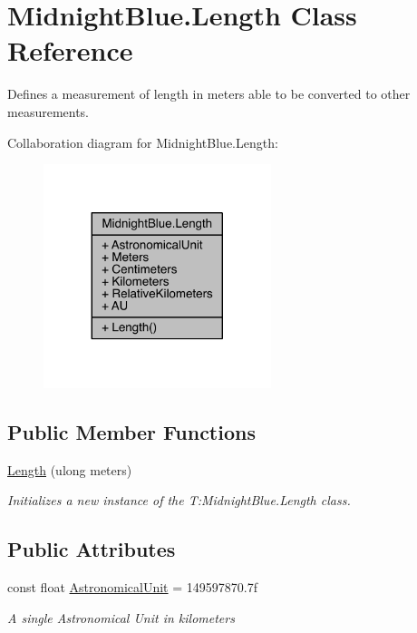 \hypertarget{class_midnight_blue_1_1_length}{}\section{Midnight\+Blue.\+Length Class Reference}
\label{class_midnight_blue_1_1_length}


Defines a measurement of length in meters able to be converted to other measurements.  




Collaboration diagram for Midnight\+Blue.\+Length\+:
\nopagebreak
\begin{figure}[H]
\begin{center}
\leavevmode
\includegraphics[width=188pt]{class_midnight_blue_1_1_length__coll__graph}
\end{center}
\end{figure}
\subsection*{Public Member Functions}
\begin{DoxyCompactItemize}
\item 
\hyperlink{class_midnight_blue_1_1_length_a8c58b161c6f730c22d84b01b078bd091}{Length} (ulong meters)
\begin{DoxyCompactList}\small\item\em Initializes a new instance of the T\+:\+Midnight\+Blue.\+Length class. \end{DoxyCompactList}\end{DoxyCompactItemize}
\subsection*{Public Attributes}
\begin{DoxyCompactItemize}
\item 
const float \hyperlink{class_midnight_blue_1_1_length_a5e86fa7e1d296ca9e6c5406a863427a6}{Astronomical\+Unit} = 149597870.\+7f
\begin{DoxyCompactList}\small\item\em A single Astronomical Unit in kilometers \end{DoxyCompactList}\end{DoxyCompactItemize}
